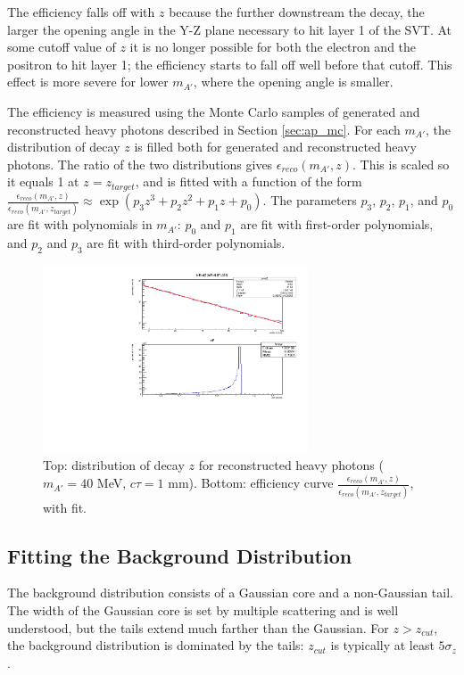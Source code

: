 The efficiency falls off with $z$ because the further downstream the decay, the larger the opening angle in the Y-Z plane necessary to hit layer 1 of the SVT.
At some cutoff value of $z$ it is no longer possible for both the electron and the positron to hit layer 1; the efficiency starts to fall off well before that cutoff.
This effect is more severe for lower $m_{A'}$, where the opening angle is smaller.

The efficiency is measured using the Monte Carlo samples of generated and reconstructed heavy photons described in Section \ref{sec:ap_mc}.
For each $m_{A'}$, the distribution of decay $z$ is filled both for generated and reconstructed heavy photons.
The ratio of the two distributions gives $\epsilon_{reco}(m_{A'},z)$.
This is scaled so it equals 1 at $z=z_{target}$, and is fitted with a function of the form $\frac{\epsilon_{reco}(m_{A'},z)}{\epsilon_{reco}(m_{A'},z_{target})} \approx \exp(p_3 z^3 + p_2 z^2 + p_1 z + p_0)$.
The parameters $p_3$, $p_2$, $p_1$, and $p_0$ are fit with polynomials in $m_{A'}$: $p_0$ and $p_1$ are fit with first-order polynomials, and $p_2$ and $p_3$ are fit with third-order polynomials.

\begin{figure}[ht]
\begin{center}
    \includegraphics[width=0.7\textwidth,page=2,angle=-90]{vertexing/figs/acceptance_40}
\end{center}
    \caption{Top: distribution of decay $z$ for reconstructed heavy photons ($m_{A'}=40$ MeV, $c\tau=1$ mm). Bottom: efficiency curve $\frac{\epsilon_{reco}(m_{A'},z)}{\epsilon_{reco}(m_{A'},z_{target})}$, with fit.}
    \label{fig:eff_z}
\end{figure}

\clearpage
\subsection{Fitting the Background Distribution}
\label{sec:tails}
The background distribution consists of a Gaussian core and a non-Gaussian tail.
The width of the Gaussian core is set by multiple scattering and is well understood, but the tails extend much farther than the Gaussian.
For $z>z_{cut}$, the background distribution is dominated by the tails: $z_{cut}$ is typically at least $5\sigma_z$.

